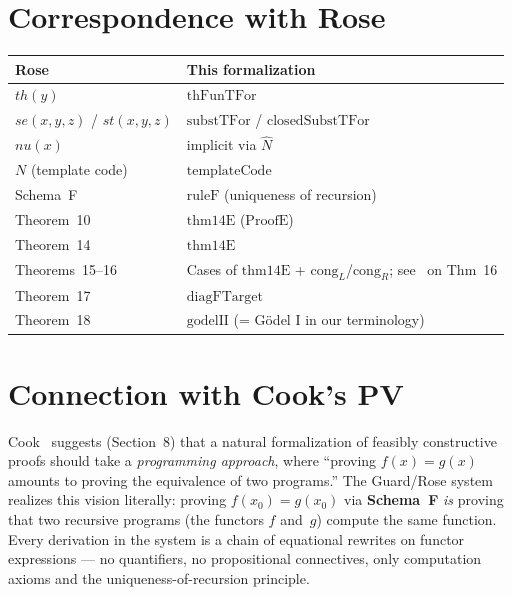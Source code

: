 \documentclass[11pt]{article}
\newcommand{\SchemaF}{\textbf{Schema~F}}
\begin{document}
\section{Correspondence with Rose}

\begin{center}
\begin{tabular}{ll}
\hline
\textbf{Rose~\cite{rose1961}} & \textbf{This formalization} \\
\hline
$th(y)$ & $\mathrm{thFunTFor}$ \\
$se(x,y,z)$ / $st(x,y,z)$ & $\mathrm{substTFor}$ / $\mathrm{closedSubstTFor}$ \\
$nu(x)$ & implicit via $\hat{N}$ \\
$N$ (template code) & $\mathrm{templateCode}$ \\
Schema~F & $\mathrm{ruleF}$ (uniqueness of recursion) \\
Theorem~10 & $\mathrm{thm14E}$ ($\mathrm{ProofE}$) \\
Theorem~14 & $\mathrm{thm14E}$ \\
Theorems~15--16 & Cases of $\mathrm{thm14E}$ + $\mathrm{cong}_L$/$\mathrm{cong}_R$; see~\cite{cook1975} on Thm~16 \\
Theorem~17 & $\mathrm{diagFTarget}$ \\
Theorem~18 & $\mathrm{godelII}$ (= G\"odel I in our terminology) \\
\hline
\end{tabular}
\end{center}

\section{Connection with Cook's PV}

Cook~\cite{cook1975} suggests (Section~8) that a natural
formalization of feasibly constructive proofs should take a
\emph{programming approach}, where ``proving $f(x) = g(x)$
amounts to proving the equivalence of two programs.''
The Guard/Rose system realizes this vision literally:
proving $f(x_0) = g(x_0)$ via \SchemaF{} \emph{is} proving
that two recursive programs (the functors $f$ and~$g$) compute
the same function.
Every derivation in the system is a chain of equational
rewrites on functor expressions --- no quantifiers, no
propositional connectives, only computation axioms and
the uniqueness-of-recursion principle.



\end{document}
